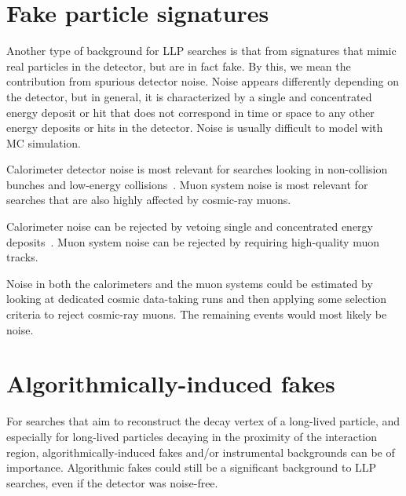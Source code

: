 \section{Fake particle signatures} %

Another type of background for LLP searches is that from signatures that mimic real particles in the detector, but are in fact fake. By this, we mean the contribution from spurious detector noise. Noise appears differently depending on the detector, but in general, it is characterized by a single and concentrated energy deposit or hit that does not correspond in time or space to any other energy deposits or hits in the detector. Noise is usually difficult to model with MC simulation.

Calorimeter detector noise is most relevant for searches looking in non-collision bunches and low-energy collisions~\cite{Khachatryan:2015jha, Chatrchyan:2012dxa, Khachatryan:2010uf}. Muon system noise is most relevant for searches that are also highly affected by cosmic-ray muons.

Calorimeter noise can be rejected by vetoing single and concentrated energy deposits~\cite{Khachatryan:2015jha, Chatrchyan:2012dxa, Khachatryan:2010uf}. Muon system noise can be rejected by requiring high-quality muon tracks.

Noise in both the calorimeters and the muon systems could be estimated by looking at dedicated cosmic data-taking runs and then applying some selection criteria to reject cosmic-ray muons. The remaining events would most likely be noise.

\section{Algorithmically-induced fakes} %

For searches that aim to reconstruct the decay vertex of a long-lived particle, and especially for long-lived particles decaying in the proximity of the interaction region, algorithmically-induced fakes and/or instrumental backgrounds can be of importance. Algorithmic fakes could still be a significant background to LLP searches, even if the detector was noise-free.

